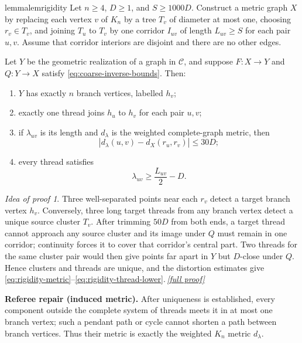 \documentclass[11pt,a4paper]{article}
\theoremstyle{plain}
\theoremstyle{definition}
\theoremstyle{remark}
\newtheorem*{proofidea}{Idea of proof}
\newcommand{\fullproofref}[1]{\,\hyperref[#1]{\textit{[full proof]}}}
\newcommand{\cC}{\mathcal C}
\begin{document}
\begin{restatable}{lemma}{lemrigidity}\label{lem:rigidity}
Let $n\ge4$, $D\ge1$, and $S\ge1000D$. Construct a metric graph $X$ by replacing each vertex $v$ of $K_n$ by a tree $T_v$ of diameter at most one, choosing $r_v\in T_v$, and joining $T_u$ to $T_v$ by one corridor $I_{uv}$ of length $L_{uv}\ge S$ for each pair $u,v$. Assume that corridor interiors are disjoint and there are no other edges.

Let $Y$ be the geometric realization of a graph in $\cC$, and suppose $F\colon X\to Y$ and $Q\colon Y\to X$ satisfy \eqref{eq:coarse-inverse-bounds}. Then:
\begin{enumerate}[label=\textup{(\roman*)}]
\item $Y$ has exactly $n$ branch vertices, labelled $h_v$;
\item exactly one thread joins $h_u$ to $h_v$ for each pair $u,v$;
\item if $\lambda_{uv}$ is its length and $d_\lambda$ is the weighted complete-graph metric, then
\[
 |d_\lambda(u,v)-d_X(r_u,r_v)|\le30D;
\tag{4.1}\label{eq:rigidity-metric}
\]
\item every thread satisfies
\[
 \lambda_{uv}\ge\frac{L_{uv}}2-D.
\tag{4.2}\label{eq:rigidity-thread-lower}
\]
\end{enumerate}
\end{restatable}
\begin{proofidea}
Three well-separated points near each $r_v$ detect a target branch vertex $h_v$. Conversely, three long target threads from any branch vertex detect a unique source cluster $T_v$. After trimming $50D$ from both ends, a target thread cannot approach any source cluster and its image under $Q$ must remain in one corridor; continuity forces it to cover that corridor's central part. Two threads for the same cluster pair would then give points far apart in $Y$ but $D$-close under $Q$. Hence clusters and threads are unique, and the distortion estimates give \eqref{eq:rigidity-metric}--\eqref{eq:rigidity-thread-lower}.\fullproofref{pf:rigidity}
\end{proofidea}

\begin{repairbox}
\textbf{Referee repair (induced metric).} After uniqueness is established, every component outside the complete system of threads meets it in at most one branch vertex; such a pendant path or cycle cannot shorten a path between branch vertices. Thus their metric is exactly the weighted $K_n$ metric $d_\lambda$.
\end{repairbox}
\end{document}
